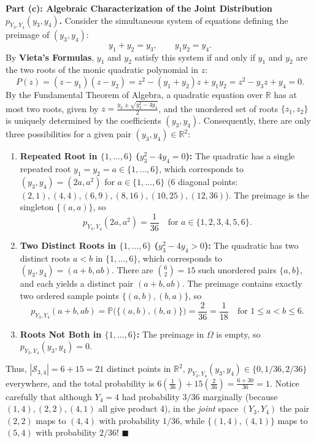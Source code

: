 \documentclass[11pt, letterpaper]{article}
\theoremstyle{definition}
\theoremstyle{remark}
\newcommand{\R}{\mathbb{R}}
\newcommand{\Prob}{\mathbb{P}}
\begin{document}
\textbf{Part (c): Algebraic Characterization of the Joint Distribution $p_{Y_3, Y_4}(y_3, y_4)$.}
Consider the simultaneous system of equations defining the preimage of $(y_3, y_4)$:
\[
y_1 + y_2 = y_3, \qquad y_1 y_2 = y_4.
\]
By \textbf{Vieta's Formulas}, $y_1$ and $y_2$ satisfy this system if and only if $y_1$ and $y_2$ are the two roots of the monic quadratic polynomial in $z$:
\[
P(z) = (z - y_1)(z - y_2) = z^2 - (y_1 + y_2)z + y_1 y_2 = z^2 - y_3 z + y_4 = 0.
\]
By the Fundamental Theorem of Algebra, a quadratic equation over $\R$ has at most two roots, given by $z = \frac{y_3 \pm \sqrt{y_3^2 - 4y_4}}{2}$, and the unordered set of roots $\{z_1, z_2\}$ is uniquely determined by the coefficients $(y_3, y_4)$. Consequently, there are only three possibilities for a given pair $(y_3, y_4) \in \R^2$:
\begin{enumerate}[label=\textbf{Case \arabic*:}]
    \item \textbf{Repeated Root in $\{1, \dots, 6\}$ ($y_3^2 - 4y_4 = 0$):} The quadratic has a single repeated root $y_1 = y_2 = a \in \{1, \dots, 6\}$, which corresponds to $(y_3, y_4) = (2a, a^2)$ for $a \in \{1, \dots, 6\}$ (6 diagonal points: $(2,1), (4,4), (6,9), (8,16), (10,25), (12,36)$). The preimage is the singleton $\{(a, a)\}$, so
    \[
    p_{Y_3, Y_4}(2a, a^2) = \frac{1}{36} \quad \text{for } a \in \{1, 2, 3, 4, 5, 6\}.
    \]
    \item \textbf{Two Distinct Roots in $\{1, \dots, 6\}$ ($y_3^2 - 4y_4 > 0$):} The quadratic has two distinct roots $a < b$ in $\{1, \dots, 6\}$, which corresponds to $(y_3, y_4) = (a+b, ab)$. There are $\binom{6}{2} = 15$ such unordered pairs $\{a, b\}$, and each yields a distinct pair $(a+b, ab)$. The preimage contains exactly two ordered sample points $\{(a, b), (b, a)\}$, so
    \[
    p_{Y_3, Y_4}(a+b, ab) = \Prob\bigl(\{(a, b), (b, a)\}\bigr) = \frac{2}{36} = \frac{1}{18} \quad \text{for } 1 \le a < b \le 6.
    \]
    \item \textbf{Roots Not Both in $\{1, \dots, 6\}$:} The preimage in $\Omega$ is empty, so $p_{Y_3, Y_4}(y_3, y_4) = 0$.
\end{enumerate}
Thus, $|\mathcal{S}_{3,4}| = 6 + 15 = 21$ distinct points in $\R^2$, $p_{Y_3, Y_4}(y_3, y_4) \in \{0, 1/36, 2/36\}$ everywhere, and the total probability is $6\left(\frac{1}{36}\right) + 15\left(\frac{2}{36}\right) = \frac{6 + 30}{36} = 1$. Notice carefully that although $Y_4 = 4$ had probability $3/36$ marginally (because $(1,4), (2,2), (4,1)$ all give product 4), in the \emph{joint} space $(Y_3, Y_4)$ the pair $(2,2)$ maps to $(4, 4)$ with probability $1/36$, while $\{(1,4), (4,1)\}$ maps to $(5, 4)$ with probability $2/36$! $\blacksquare$
\end{document}
